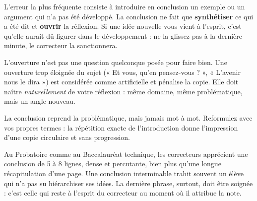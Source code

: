 \documentclass[11pt]{article}
\begin{document}
\begin{attention}
L'erreur la plus fréquente consiste à introduire en conclusion un exemple ou un argument qui n'a pas été développé. La conclusion ne fait que \textbf{synthétiser} ce qui a été dit et \textbf{ouvrir} la réflexion. Si une idée nouvelle vous vient à l'esprit, c'est qu'elle aurait dû figurer dans le développement : ne la glissez pas à la dernière minute, le correcteur la sanctionnera.
\end{attention}

\begin{attention}
L'ouverture n'est pas une question quelconque posée pour faire bien. Une ouverture trop éloignée du sujet (« Et vous, qu'en pensez-vous ? », « L'avenir nous le dira ») est considérée comme artificielle et pénalise la copie. Elle doit naître \emph{naturellement} de votre réflexion : même domaine, même problématique, mais un angle nouveau.
\end{attention}

\begin{attention}
La conclusion reprend la problématique, mais jamais mot à mot. Reformulez avec vos propres termes : la répétition exacte de l'introduction donne l'impression d'une copie circulaire et sans progression.
\end{attention}

\begin{savaistu}
Au Probatoire comme au Baccalauréat technique, les correcteurs apprécient une conclusion de 5 à 8 lignes, dense et percutante, bien plus qu'une longue récapitulation d'une page. Une conclusion interminable trahit souvent un élève qui n'a pas su hiérarchiser ses idées. La dernière phrase, surtout, doit être soignée : c'est celle qui reste à l'esprit du correcteur au moment où il attribue la note.
\end{savaistu}
\end{document}
